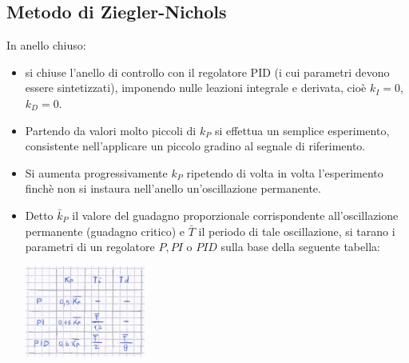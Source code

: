     \subsection{Metodo di Ziegler-Nichols}
    In anello chiuso:
    \begin{itemize}
        \item si chiuse l'anello di controllo con il regolatore PID (i cui parametri devono essere sintetizzati), imponendo nulle leazioni integrale e derivata, cioè $k_I = 0$, $k_D = 0$.
        \item Partendo da valori molto piccoli di $k_P$ si effettua un semplice esperimento, consistente nell'applicare un piccolo gradino al segnale di riferimento.
        \item Si aumenta progressivamente $k_P$ ripetendo di volta in volta l'esperimento finchè non si instaura nell'anello un'oscillazione permanente.
        \item Detto $\bar{k}_P$ il valore del guadagno proporzionale corrispondente all'oscillazione permanente (guadagno critico) e $\bar{T}$ il periodo di tale oscillazione, si tarano i parametri di un regolatore $P, PI$ o $PID$ sulla base della seguente tabella:
        \begin{center}
            \includegraphics[height=3cm]{../formulario/img7.JPG}
        \end{center}
    \end{itemize}
